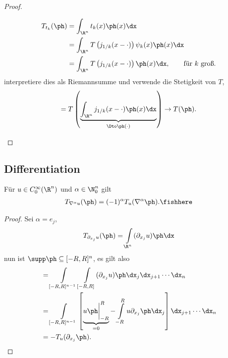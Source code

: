 \begin{proof}
\begin{enumerate}[label=\arabic{*}.)]
\begin{enumerate}[label=\alph{*})]
\begin{align*}
T_{t_k}(\ph) &= \int_{\R^n} t_k(x)\ph(x)\dx\\
&= \int_{\R^n}
T\left(j_{1/k}(x-\cdot)\right)\psi_k(x)\ph(x)
\dx\\
&= \int_{\R^n}T\left(j_{1/k}(x-\cdot)\right)\ph(x)
\dx,\qquad \text{für $k$ groß}.
\end{align*}
interpretiere dies als Riemannsumme und verwende die Stetigkeit von $T$,
\begin{align*}
=T\left(\underbrace{\int_{\R^n} j_{1/k}(x-\cdot)\ph(x)
\dx}_{\Dto \ph(\cdot)}\right) \to T(\ph).\qedhere
\end{align*}
\end{enumerate}
\end{enumerate}
\end{proof}

\subsection{Differentiation}

\begin{lem}
\label{prop:3.11}
Für $u\in C_0^\infty(\R^n)$ und $\alpha\in\N_0^n$ gilt
\begin{align*}
T_{\nabla^\alpha u}(\ph) = (-1)^\alpha T_u(\nabla^\alpha \ph).\fishhere
\end{align*}
\end{lem}
\begin{proof}
Sei $\alpha=e_j$,
\begin{align*}
T_{\partial_{x_j} u}(\ph) = \int\limits_{\R^n} (\partial_{x_j} u)\ph\dx
\end{align*}
nun ist $\supp\ph\subseteq [-R,R]^n$, es gilt also
\begin{align*}
&= \int\limits_{[-R,R]^{n-1}}\int\limits_{[-R,R]} (\partial_{x_j} u)\ph
\dx_{j}\dx_{j+1}\cdots\dx_{n}\\
&= \int\limits_{[-R,R]^{n-1}}\left[\underbrace{u\ph\bigg|_{-R}^R}_{=0}
-\int\limits_{-R}^R u\partial_{x_j} \ph\dx_j\right]\dx_{j+1}\cdots\dx_{n}\\
&= -T_u(\partial_{x_j}\ph ).\qedhere
\end{align*}
\end{proof}

